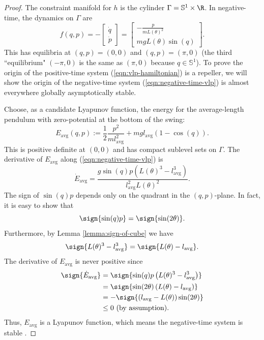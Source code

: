 \begin{proof}
   The constraint manifold for \(h\) is the cylinder \(\Gamma = \mathbb{S}^1 \times \R \). 
   In negative-time, the dynamics on \(\Gamma\) are
   \begin{equation}\label{eqn:negative-time-vlp}
      f(q,p) = 
      -\begin{bmatrix}
         \dot{q} \\ \dot{p}
      \end{bmatrix} = \begin{bmatrix}
         -\frac{p}{mL(\theta)^2} \\
         mgL(\theta)\sin(q)
      \end{bmatrix}
      .
   \end{equation}
   This has equilibria at \((q,p) = (0,0)\) and \((q,p) = (\pi,0)\) (the
   third ``equilibrium" \((-\pi,0)\) is the same as \((\pi,0)\) because 
   \(q \in \mathbb{S}^1\)).
   To prove the origin of the positive-time system (\ref{eqn:vlp-hamiltonian})
   is a repeller, we will show the origin of the negative-time system 
   (\ref{eqn:negative-time-vlp}) is almost everywhere globally asymptotically
   stable. 

   Choose, as a candidate Lyapunov function, the energy for the
   average-length pendulum with zero-potential at the bottom of the swing:
   \[
       E_\text{avg}(q,p) := \frac{1}{2}\frac{p^2}{m l_\text{avg}^2} 
           + m g l_\text{avg} (1-\cos(q))
      .
   \]
   This is positive definite at \((0,0)\) and has compact sublevel
   sets on \(\Gamma\). 
   The derivative of \(E_\text{avg}\) along (\ref{eqn:negative-time-vlp}) is
   \[
      \dot{E}_\text{avg} = \frac{g\sin(q)p \left(L(\theta)^3 - l_\text{avg}^3\right)}
              {l_\text{avg}^2L(\theta)^2}
      .
   \]
   The sign of \(\sin(q)p\) depends only on the quadrant in the
   \((q,p)\)-plane. In fact, it is easy to show that
   \[
      \sign{\sin(q)p} = \sign{\sin(2\theta)}
      .
   \]
   Furthermore, by Lemma \ref{lemma:sign-of-cube} we have
   \[ 
       \sign{L(\theta)^3 - l_\text{avg}^3} = \sign{L(\theta) - l_\text{avg}}
       .
   \]
   The derivative of \(E_\text{avg}\) is never positive since
   \begin{align}\label{eqn:vlp-proof-neg-inv}
    \sign{\dot{E}_\text{avg}} &= \sign{\sin(q)p \left(L(\theta)^3 - l_\text{avg}^3\right)}
          \nonumber \\
          &= \sign{\sin(2\theta) \left(L(\theta) - l_\text{avg}\right)}
          \nonumber \\
          &= -\sign{(l_\text{avg} - L(\theta))\sin(2\theta)} 
          \nonumber \\
          &\leq 0 \text{ (by assumption)}
      .
   \end{align}
   Thus, \(E_\text{avg}\) is a Lyapunov function, which means the negative-time system is
   stable \cite{lyapunov}. 


\end{proof}
